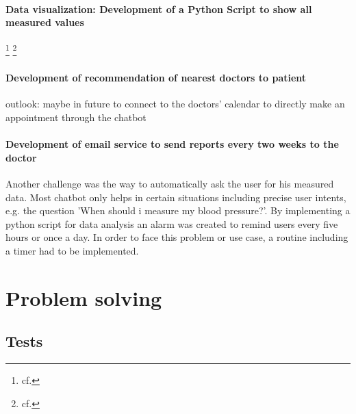 \paragraph{Data visualization: Development of a Python Script to show all measured values} 
\footnote{cf.\autocite{kaggle}}
\footnote{cf.\autocite{decision_tree_python}}


\paragraph{Development of recommendation of nearest doctors to patient}
outlook: maybe in future to connect to the doctors' calendar to directly make an appointment through the chatbot

\paragraph{Development of email service to send reports every two weeks to the doctor}

Another challenge was the way to automatically ask the user for his measured data. Most chatbot only helps in certain situations including precise user intents, e.g. the question 'When should i measure my blood pressure?'. By implementing a python script for data analysis an alarm was created to remind users every five hours or once a day.
In order to face this problem or use case, a routine including a timer had to be implemented.

\section{Problem solving}
\subsection{Tests}
